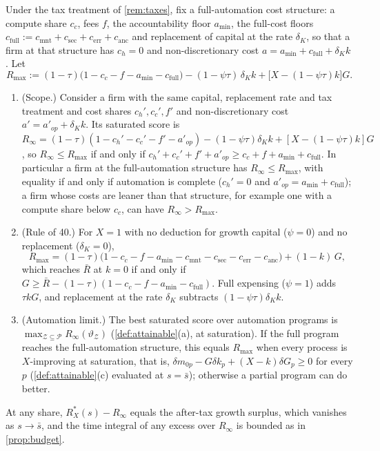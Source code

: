 \begin{corollary}\label{cor:ceiling}
Under the tax treatment of \autoref{rem:taxes}, fix a full-automation cost structure: a compute share $c_c$, fees $f$, the accountability floor $a_{\min}$, the full-cost floors $c_{\mathrm{full}}:=c_{\mathrm{mnt}}+c_{\mathrm{sec}}+c_{\mathrm{err}}+c_{\mathrm{anc}}$ and replacement of capital at the rate $\delta_K$, so that a firm at that structure has $c_h=0$ and non-discretionary cost $a=a_{\min}+c_{\mathrm{full}}+\delta_Kk$. Let
\[
R_{\max}:=(1-\tau)\bigl(1-c_c-f-a_{\min}-c_{\mathrm{full}}\bigr)-(1-\psi\tau)\,\delta_Kk+\bigl[X-(1-\psi\tau)k\bigr]G .
\]
\begin{enumerate}
\item[(a)] (Scope.) Consider a firm with the same capital, replacement rate and tax treatment and cost shares $c_h',c_c',f'$ and non-discretionary cost $a'=a'_{op}+\delta_Kk$. Its saturated score is $R_\infty=(1-\tau)(1-c_h'-c_c'-f'-a'_{op})-(1-\psi\tau)\delta_Kk+[X-(1-\psi\tau)k]G$, so $R_\infty\le R_{\max}$ if and only if $c_h'+c_c'+f'+a'_{op}\ge c_c+f+a_{\min}+c_{\mathrm{full}}$. In particular a firm at the full-automation structure has $R_\infty\le R_{\max}$, with equality if and only if automation is complete ($c_h'=0$ and $a'_{op}=a_{\min}+c_{\mathrm{full}}$); a firm whose costs are leaner than that structure, for example one with a compute share below $c_c$, can have $R_\infty>R_{\max}$.
\item[(b)] (Rule of 40.) For $X=1$ with no deduction for growth capital ($\psi=0$) and no replacement ($\delta_K=0$),
\begin{equation}\label{eq:Rmax}
R_{\max}=(1-\tau)\bigl(1-c_c-f-a_{\min}-c_{\mathrm{mnt}}-c_{\mathrm{sec}}-c_{\mathrm{err}}-c_{\mathrm{anc}}\bigr)+(1-k)\,G ,
\end{equation}
which reaches $\bar R$ at $k=0$ if and only if $G\ge\bar R-(1-\tau)(1-c_c-f-a_{\min}-c_{\mathrm{full}})$. Full expensing ($\psi=1$) adds $\tau kG$, and replacement at the rate $\delta_K$ subtracts $(1-\psi\tau)\delta_Kk$.
\item[(c)] (Automation limit.) The best saturated score over automation programs is $\max_{\mathcal Z\subseteq\mathcal P}R_\infty(\vartheta_{\mathcal Z})$ (\autoref{def:attainable}(a), at saturation). If the full program reaches the full-automation structure, this equals $R_{\max}$ when every process is $X$-improving at saturation, that is, $\delta m_{0p}-G\delta k_p+(X-k)\delta G_p\ge0$ for every $p$ (\autoref{def:attainable}(c) evaluated at $s=\bar s$); otherwise a partial program can do better.
\end{enumerate}
At any share, $R_X^*(s)-R_\infty$ equals the after-tax growth surplus, which vanishes as $s\to\bar s$, and the time integral of any excess over $R_\infty$ is bounded as in \autoref{prop:budget}.
\end{corollary}

